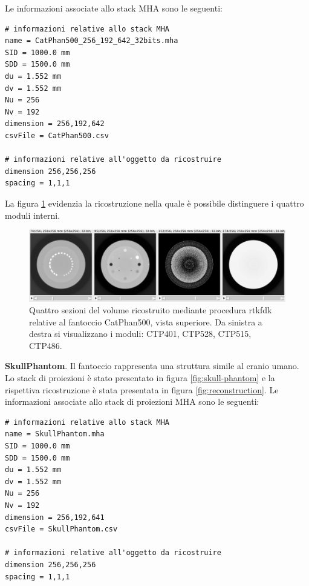 \documentclass[a4paper,12pt, doubleside]{report}
\begin{document}
                Le informazioni associate allo stack MHA sono le seguenti:
                
                \begin{lstlisting}
# informazioni relative allo stack MHA
name = CatPhan500_256_192_642_32bits.mha
SID = 1000.0 mm
SDD = 1500.0 mm
du = 1.552 mm
dv = 1.552 mm
Nu = 256
Nv = 192
dimension = 256,192,642
csvFile = CatPhan500.csv

# informazioni relative all'oggetto da ricostruire
dimension 256,256,256
spacing = 1,1,1
                \end{lstlisting}       
                
                La figura \ref{fig:catphan-recon} evidenzia la ricostruzione nella quale è possibile distinguere i quattro moduli interni. 
                \begin{figure}[h]
                    \centering
                    \includegraphics[width=1\textwidth]{catphan-recon}
                    \caption{Quattro sezioni del volume ricostruito mediante procedura rtkfdk relative al fantoccio CatPhan500, vista superiore. Da sinistra a destra si visualizzano i moduli: CTP401, CTP528, CTP515, CTP486.}
                    \label{fig:catphan-recon}
                \end{figure}
                
            \bigskip
            \par
                \textbf{SkullPhantom}. Il fantoccio rappresenta una struttura simile al cranio umano. Lo stack di proiezioni è stato presentato in figura \ref{fig:skull-phantom} e la rispettiva ricostruzione è stata presentata in figura \ref{fig:reconstruction}. Le informazioni associate allo stack di proiezioni MHA sono le seguenti:
                
                \begin{lstlisting}
# informazioni relative allo stack MHA
name = SkullPhantom.mha
SID = 1000.0 mm
SDD = 1500.0 mm
du = 1.552 mm
dv = 1.552 mm
Nu = 256
Nv = 192
dimension = 256,192,641
csvFile = SkullPhantom.csv

# informazioni relative all'oggetto da ricostruire
dimension 256,256,256
spacing = 1,1,1
                \end{lstlisting} 
                
\end{document}
